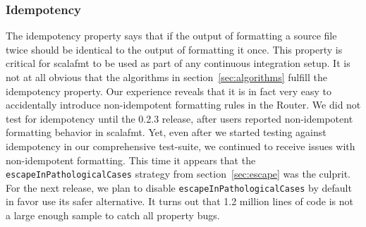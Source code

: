 \subsubsection{Idempotency}
The idempotency property says that if the output of formatting a source file twice should be identical to the output of formatting it once.
This property is critical for scalafmt to be used as part of any continuous integration setup.
It is not at all obvious that the algorithms in section~\ref{sec:algorithms} fulfill the idempotency property.
Our experience reveals that it is in fact very easy to accidentally introduce non-idempotent formatting rules in the Router.
We did not test for idempotency until the 0.2.3 release, after users reported non-idempotent formatting behavior in scalafmt.
Yet, even after we started testing against idempotency in our comprehensive test-suite, we continued to receive issues with non-idempotent formatting.
This time it appears that the \texttt{escapeInPathologicalCases} strategy from section~\ref{sec:escape} was the culprit.
For the next release, we plan to disable \texttt{escapeInPathologicalCases} by default in favor use its safer alternative.
It turns out that 1.2 million lines of code is not a large enough sample to catch all property bugs.
